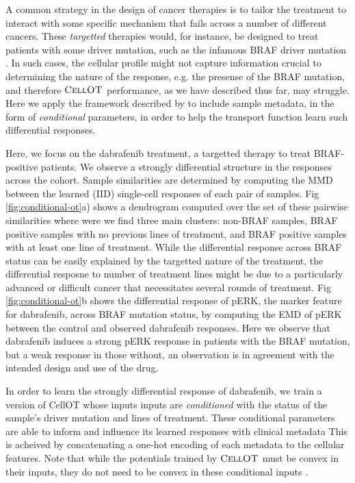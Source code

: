 A common strategy in the design of cancer therapies is to tailor the treatment to interact with some specific mechanism that fails across a number of different cancers.
These \emph{targetted} therapies would, for instance, be designed to treat patients with some driver mutation, such as the infamous BRAF driver mutation \cite{need}.
In such cases, the cellular profile might not capture information crucial to determining the nature of the response, e.g. the presense of the BRAF mutation,
and therefore $\textsc{CellOT}$ performance, as we have described thus far, may struggle.
Here we apply the framework described by \cite{need} to include sample metadata, in the form of \emph{conditional} parameters, in order to help the transport function learn such differential responses.

Here, we focus on the dabrafenib treatment, a targetted therapy to treat BRAF-positive patients.
We observe a strongly differential structure in the responses across the cohort.
Sample similarities are determined by computing the MMD between the learned (IID) single-cell responses of each pair of samples.
Fig \ref{fig:conditional-ot}a) shows a dendrogram computed over the set of these pairwise similarities where were we find three main clusters: non-BRAF samples, BRAF positive samples with no previous lines of treatment, and BRAF positive samples with at least one line of treatment.
While the differential response across BRAF status can be easily explained by the targetted nature of the treatment, the differential resposne to number of treatment lines might be due to a particularly advanced or difficult cancer that necessitates several rounds of treatment.
Fig \ref{fig:conditional-ot}b shows the differential response of pERK, the marker feature for dabrafenib, across BRAF mutation status, by computing the EMD of pERK between the control and observed dabrafenib responses.
Here we observe that dabrafenib induces a strong pERK response in patients with the BRAF mutation, but a weak response in those without,
an observation is in agreement with the intended design and use of the drug.

In order to learn the strongly differential response of dabrafenib,
we train a version of CellOT whose inputs inputs are \emph{conditioned} \cite{condot} with the status of the sample's driver mutation and lines of treatment. 
These conditional parameters are able to inform and influence its learned responses with clinical metadata
This is acheived by concatenating a one-hot encoding of each metadata to the cellular features.
Note that while the potentials trained by $\textsc{CellOT}$ must be convex in their inputs,
they do not need to be convex in these conditional inputs \cite{icnn}.

